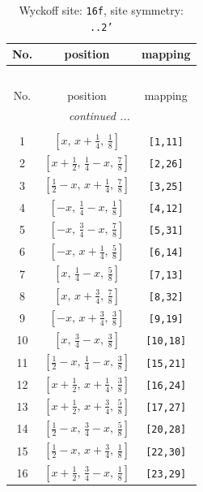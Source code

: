 \documentclass[fleqn,8pt]{jsarticle}
\begin{document}
\renewcommand{\arraystretch}{1.2}
\begin{longtable}{ccc}
\caption{Wyckoff site: {\tt 16f}, site symmetry: {\tt ..2'}}
 \\
 \hline \hline
No. & position & mapping \\ \hline \endfirsthead

\multicolumn{2}{l}{\tablename\ \thetable{}} \\
 \hline \hline
No. & position & mapping \\ \hline \endhead

 \hline \hline
\multicolumn{2}{r}{\footnotesize\it continued ...} \\ \endfoot

 \hline \hline
\multicolumn{2}{r}{} \\ \endlastfoot

1 & $\left[ x,\, x + \frac{1}{4},\, \frac{1}{8} \right]$ & {\tt [1,11]} \\ \hline
2 & $\left[ x + \frac{1}{2},\, \frac{1}{4} - x,\, \frac{7}{8} \right]$ & {\tt [2,26]} \\ \hline
3 & $\left[ \frac{1}{2} - x,\, x + \frac{1}{4},\, \frac{7}{8} \right]$ & {\tt [3,25]} \\ \hline
4 & $\left[ - x,\, \frac{1}{4} - x,\, \frac{1}{8} \right]$ & {\tt [4,12]} \\ \hline
5 & $\left[ - x,\, \frac{3}{4} - x,\, \frac{7}{8} \right]$ & {\tt [5,31]} \\ \hline
6 & $\left[ - x,\, x + \frac{1}{4},\, \frac{5}{8} \right]$ & {\tt [6,14]} \\ \hline
7 & $\left[ x,\, \frac{1}{4} - x,\, \frac{5}{8} \right]$ & {\tt [7,13]} \\ \hline
8 & $\left[ x,\, x + \frac{3}{4},\, \frac{7}{8} \right]$ & {\tt [8,32]} \\ \hline
9 & $\left[ - x,\, x + \frac{3}{4},\, \frac{3}{8} \right]$ & {\tt [9,19]} \\ \hline
10 & $\left[ x,\, \frac{3}{4} - x,\, \frac{3}{8} \right]$ & {\tt [10,18]} \\ \hline
11 & $\left[ \frac{1}{2} - x,\, \frac{1}{4} - x,\, \frac{3}{8} \right]$ & {\tt [15,21]} \\ \hline
12 & $\left[ x + \frac{1}{2},\, x + \frac{1}{4},\, \frac{3}{8} \right]$ & {\tt [16,24]} \\ \hline
13 & $\left[ x + \frac{1}{2},\, x + \frac{3}{4},\, \frac{5}{8} \right]$ & {\tt [17,27]} \\ \hline
14 & $\left[ \frac{1}{2} - x,\, \frac{3}{4} - x,\, \frac{5}{8} \right]$ & {\tt [20,28]} \\ \hline
15 & $\left[ \frac{1}{2} - x,\, x + \frac{3}{4},\, \frac{1}{8} \right]$ & {\tt [22,30]} \\ \hline
16 & $\left[ x + \frac{1}{2},\, \frac{3}{4} - x,\, \frac{1}{8} \right]$ & {\tt [23,29]} \\
\end{longtable}
\end{document}
